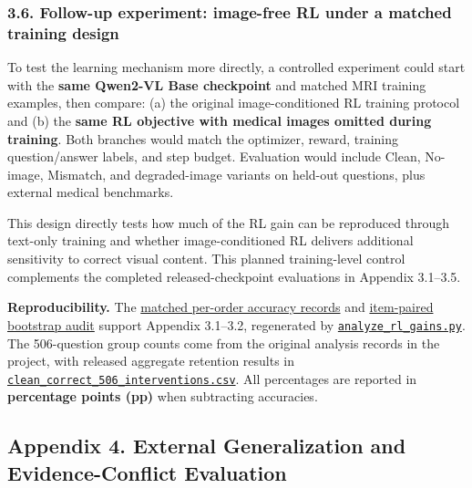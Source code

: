 \documentclass[
  10pt,
  a4paper,
]{article}
\begin{document}
\subsubsection{3.6. Follow-up experiment: image-free RL under a matched
training
design}\label{follow-up-experiment-image-free-rl-under-a-matched-training-design}

To test the learning mechanism more directly, a controlled experiment
could start with the \textbf{same Qwen2-VL Base checkpoint} and matched
MRI training examples, then compare: (a) the original image-conditioned
RL training protocol and (b) the \textbf{same RL objective with medical
images omitted during training}. Both branches would match the
optimizer, reward, training question/answer labels, and step budget.
Evaluation would include Clean, No-image, Mismatch, and degraded-image
variants on held-out questions, plus external medical benchmarks.

This design directly tests how much of the RL gain can be reproduced
through text-only training and whether image-conditioned RL delivers
additional sensitivity to correct visual content. This planned
training-level control complements the completed released-checkpoint
evaluations in Appendix 3.1--3.5.

\textbf{Reproducibility.} The
\href{https://github.com/bbuller591-sketch/medical-vlm-visual-reliance/blob/main/results/official825_scores.csv}{matched
per-order accuracy records} and
\href{https://github.com/bbuller591-sketch/medical-vlm-visual-reliance/blob/main/results/rl_matched_gains_audit.json}{item-paired
bootstrap audit} support Appendix 3.1--3.2, regenerated by
\href{https://github.com/bbuller591-sketch/medical-vlm-visual-reliance/blob/main/scripts/analyze_rl_gains.py}{\texttt{analyze\_rl\_gains.py}}.
The 506-question group counts come from the original analysis records in
the project, with released aggregate retention results in
\href{https://github.com/bbuller591-sketch/medical-vlm-visual-reliance/blob/main/results/clean_correct_506_interventions.csv}{\texttt{clean\_correct\_506\_interventions.csv}}.
All percentages are reported in \textbf{percentage points (pp)} when
subtracting accuracies.

\subsection{Appendix 4. External Generalization and Evidence-Conflict
Evaluation}\label{appendix-4.-external-generalization-and-evidence-conflict-evaluation}
\end{document}
